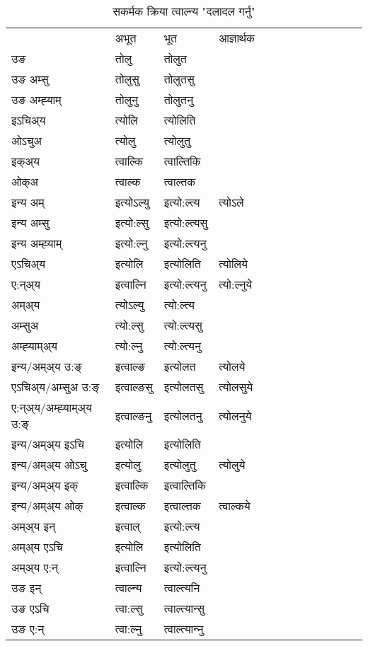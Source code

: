 \begin{table}[H]
\label{ol.vt} \centering
\caption{सकर्मक क्रिया  त्वाल्न्य  "दलादल गर्नु"  }
\begin{tabular}{l|l|l|l|l|l|l|l|l|l|l|l|l}  \toprule
&अभूत & भूत & आज्ञार्थक \\ 
उङ &तोलु &तोलुत \\ 
उङ अम्सु &तोलुसु &तोलुतसु \\ 
उङ अम्ह्‍याम् &तोलुनु &तोलुतनु \\ 
इऽचिअ्य &त्योलि &त्योलिति   \\ 
ओऽचुअ &त्योलु &त्योलुतु   \\ 
इक्अ्य &त्वाल्कि &त्वाल्तिकि   \\ 
ओक्अ &त्वाल्क &त्वाल्तक   \\ 
इन्य अम् & इत्योऽल्यु  & इत्यो:ल्त्य &त्योऽले  \\ 
इन्य अम्सु & इत्यो:ल्सु  & इत्यो:ल्त्यसु   \\ 
इन्य अम्ह्‍याम् & इत्यो:ल्नु  & इत्यो:ल्त्यनु   \\ 
एऽचिअ्य & इत्योलि & इत्योलिति &त्योलिये    \\ 
ए:न्अ्य & इत्वाल्नि  & इत्यो:ल्त्यनु &त्यो:ल्नुये  \\ 
अम्अ्य & त्योऽल्यु  & त्यो:ल्त्य  \\ 
अम्सुअ & त्यो:ल्सु & त्यो:ल्त्यसु  \\ 
अम्ह्‍याम्अ्य & त्यो:ल्नु  & त्यो:ल्त्यनु \\ 
\midrule
इन्य/अम्अ्य उ:ङ्‌&इत्वाल्ङ & इत्योलत &त्योलये \\ 
एऽचिअ्य/अम्सुअ उ:ङ्‌ &इत्वाल्ङसु & इत्योलतसु &त्योलसुये \\ 
ए:न्अ्य/अम्ह्‍याम्अ्य उ:ङ्‌ &इत्वाल्ङनु & इत्योलतनु &त्योलनुये \\ 
इन्य/अम्अ्य इऽचि & इत्योलि & इत्योलिति    \\ 
इन्य/अम्अ्य ओऽचु & इत्योलु & इत्योलुतु  &त्योलुये  \\ 
इन्य/अम्अ्य इक् & इत्वाल्कि & इत्वाल्तिकि   \\ 
इन्य/अम्अ्य ओक् & इत्वाल्क & इत्वाल्तक  &त्वाल्कये  \\ 
अम्अ्य इन् & इत्वाल् & इत्यो:ल्त्य   \\ 
अम्अ्य एऽचि & इत्योलि & इत्योलिति    \\ 
अम्अ्य ए:न् & इत्वाल्नि  & इत्यो:ल्त्यनु  \\ 
\midrule
उङ इन् & त्वाल्न्य  & त्वाल्त्यनि  \\ 
उङ एऽचि & त्वा:ल्सु  & त्वाल्त्यान्सु   \\ 
उङ ए:न्& त्वा:ल्नु  & त्वाल्त्यान्‍नु   \\ 
\bottomrule
\end{tabular}
\end{table}


